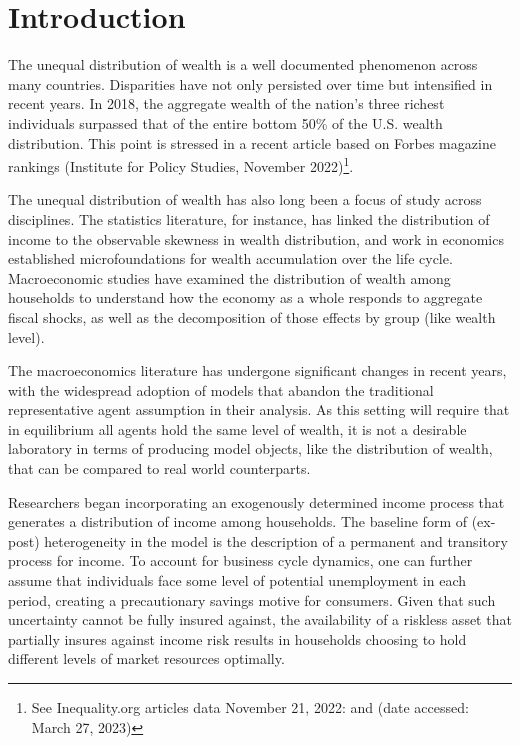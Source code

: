 
\section{Introduction}\notinsubfile{\label{sec:chapter1-intro}}


\par The unequal distribution of wealth is a well documented phenomenon across many countries. Disparities have not only persisted over time but intensified in recent years. In 2018, the aggregate wealth of the nation’s three richest individuals surpassed that of the entire bottom 50\% of the U.S. wealth distribution. This point is stressed in a recent article based on Forbes magazine rankings (Institute for Policy Studies, November 2022)\footnote{See Inequality.org articles data November 21, 2022:  and  (date accessed: March 27, 2023)}. 

\par The unequal distribution of wealth has also long been a focus of study across disciplines. The statistics literature, for instance, has linked the distribution of income to the observable skewness in wealth distribution, and work in economics established microfoundations for wealth accumulation over the life cycle. Macroeconomic studies have examined the distribution of wealth among households to understand how the economy as a whole responds to aggregate fiscal shocks, as well as the decomposition of those effects by group (like wealth level). 

\par The macroeconomics literature has undergone significant changes in recent years, with the widespread adoption of models that abandon the traditional representative agent assumption in their analysis. As this setting will require that in equilibrium all agents hold the same level of wealth, it is not a desirable laboratory in terms of producing model objects, like the distribution of wealth, that can be compared to real world counterparts.

\par Researchers began incorporating an exogenously determined income process that generates a distribution of income among households. The baseline form of (ex-post) heterogeneity in the model is the description of a permanent and transitory process for income. To account for business cycle dynamics, one can further assume that individuals face some level of potential unemployment in each period, creating a precautionary savings motive for consumers. Given that such uncertainty cannot be fully insured against, the availability of a riskless asset that partially insures against income risk results in households choosing to hold different levels of market resources optimally.

